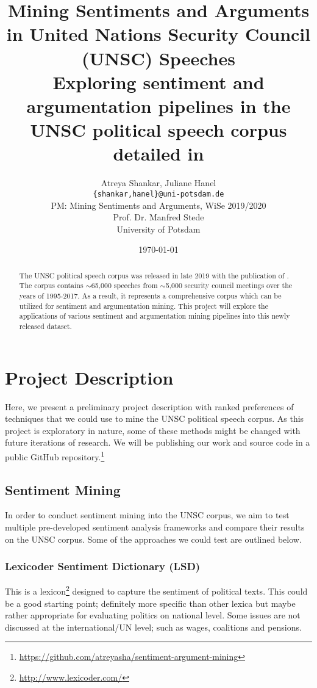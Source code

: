 \documentclass[12pt,a4paper]{article}
\title{Mining Sentiments and Arguments in United Nations Security Council (UNSC)
  Speeches \\[5pt]
\large Exploring sentiment and argumentation pipelines in the UNSC political
speech corpus detailed in \citet{schnfeld2019security}}
\author{Atreya Shankar, Juliane Hanel\\
\texttt{\{shankar,hanel\}@uni-potsdam.de} \\
PM: Mining Sentiments and Arguments, WiSe 2019/2020 \\
Prof. Dr. Manfred Stede \\
University of Potsdam}
\date{\today}
\begin{document}
\maketitle
\thispagestyle{empty}

\begin{abstract}\label{abstract}
The UNSC political speech corpus was released
in late 2019 with the publication of \citet{schnfeld2019security}. The corpus
contains $\sim$65,000 speeches from $\sim$5,000 security council meetings over
the years of 1995-2017. As a result, it represents a comprehensive corpus which
can be utilized for sentiment and argumentation mining. This project will
explore the applications of various sentiment and argumentation mining pipelines
into this newly released dataset.
\end{abstract}

\newpage \setcounter{page}{1} \thispagestyle{plain}

\section{Project Description}\label{sec:intro}

Here, we present a preliminary project description with ranked preferences of
techniques that we could use to mine the UNSC political speech corpus. As this
project is exploratory in nature, some of these methods might be changed with
future iterations of research. We will be publishing our work and source code in
a public GitHub
repository.\footnote{\url{https://github.com/atreyasha/sentiment-argument-mining}}

\subsection{Sentiment Mining}

In order to conduct sentiment mining into the UNSC corpus, we aim to test
multiple pre-developed sentiment analysis frameworks and compare their results
on the UNSC corpus. Some of the approaches we could test are outlined below.

\subsubsection{Lexicoder Sentiment Dictionary (LSD)}

This is a lexicon\footnote{\url{http://www.lexicoder.com/}} designed to capture
the sentiment of political texts. This could be a good starting point;
definitely more specific than other lexica but maybe rather appropriate for
evaluating politics on national level. Some issues are not discussed at the
international/UN level; such as wages, coalitions and pensions.
\end{document}
